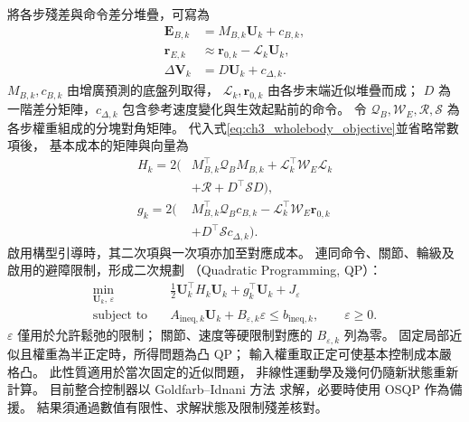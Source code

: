 將各步殘差與命令差分堆疊，可寫為
\begin{equation}
    \begin{aligned}
        \mathbf E_{B,k}&=M_{B,k}\mathbf U_k+c_{B,k},\\
        \mathbf r_{E,k}&\approx\mathbf r_{0,k}-\mathcal L_k\mathbf U_k,\\
        \Delta\mathbf V_k&=D\mathbf U_k+c_{\Delta,k}.
    \end{aligned}
    \label{eq:ch3_stacked_objective_maps}
\end{equation}
$M_{B,k},c_{B,k}$ 由增廣預測的底盤列取得，
$\mathcal L_k,\mathbf r_{0,k}$ 由各步末端近似堆疊而成；
$D$ 為一階差分矩陣，$c_{\Delta,k}$
包含參考速度變化與生效起點前的命令。
令 $\mathcal Q_B,\mathcal W_E,\mathcal R,\mathcal S$
為各步權重組成的分塊對角矩陣。
代入式\eqref{eq:ch3_wholebody_objective}並省略常數項後，
基本成本的矩陣與向量為
\begin{equation}
    \begin{aligned}
        H_k=2\big(&M_{B,k}^\top\mathcal Q_B M_{B,k}
        +\mathcal L_k^\top\mathcal W_E\mathcal L_k\\
        &+\mathcal R+D^\top\mathcal S D\big),\\
        g_k=2\big(&M_{B,k}^\top\mathcal Q_B c_{B,k}
        -\mathcal L_k^\top\mathcal W_E\mathbf r_{0,k}\\
        &+D^\top\mathcal S c_{\Delta,k}\big).
    \end{aligned}
    \label{eq:ch3_wholebody_qp_cost_matrices}
\end{equation}
啟用構型引導時，其二次項與一次項亦加至對應成本。
連同命令、關節、輪級及啟用的避障限制，形成二次規劃
（Quadratic Programming, QP）：
\begin{equation}
    \begin{aligned}
        \min_{\mathbf U_k,\,\varepsilon}\quad&
        \frac12\mathbf U_k^\top H_k\mathbf U_k
        +g_k^\top\mathbf U_k+J_\varepsilon\\
        \text{subject to}\quad&
        A_{\mathrm{ineq},k}\mathbf U_k
        +B_{\varepsilon,k}\varepsilon\leq b_{\mathrm{ineq},k},
        \qquad\varepsilon\geq0 .
    \end{aligned}
    \label{eq:ch3_wholebody_qp}
\end{equation}
$\varepsilon$ 僅用於允許鬆弛的限制；
關節、速度等硬限制對應的 $B_{\varepsilon,k}$ 列為零。
固定局部近似且權重為半正定時，所得問題為凸 QP；
輸入權重取正定可使基本控制成本嚴格凸。
此性質適用於當次固定的近似問題，
非線性運動學及幾何仍隨新狀態重新計算。
目前整合控制器以 Goldfarb--Idnani 方法
\cite{goldfarb1983dual}求解，必要時使用 OSQP
\cite{stellato2020osqp}作為備援。
結果須通過數值有限性、求解狀態及限制殘差核對。

